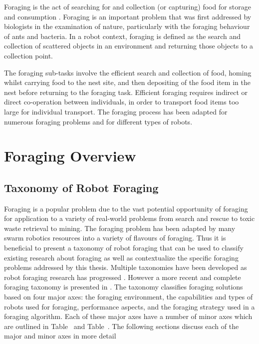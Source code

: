 Foraging is the act of searching for and collection (or capturing) food for storage and consumption \cite{winfield2009foraging}. Foraging is an important problem that was first addressed by biologists in the examination of nature, particularly with the foraging behaviour of ants and bacteria. In a robot context, foraging is defined as the search and collection of scattered objects in an environment and returning those objects to a collection point.

The foraging sub-tasks involve the efficient search and collection of food, homing whilst carrying food to the nest site, and then depositing of the food item in the nest before returning to the foraging task. Efficient foraging requires indirect or direct co-operation between individuals, in order to transport food items too large for individual transport. The foraging process has been adapted for numerous foraging problems and for different types of robots.

\section{Foraging Overview}

\subsection{Taxonomy of Robot Foraging}
\label{sec:second:types}

Foraging is a popular problem due to the vast potential opportunity of foraging for application to a variety of real-world problems from search and rescue \cite{jennings1997cooperative} to toxic waste retrieval to mining. The foraging problem has been adapted by many swarm robotics resources into a variety of flavours of foraging. Thus it is beneficial to present a taxonomy of robot foraging that can be used to classify existing research about foraging as well as contextualize the specific foraging problems addressed by this thesis. Multiple taxonomies have been developed as robot foraging research has progressed \cite{oster1978caste,ostergaard2001emergent}. However a more recent and complete foraging taxonomy is presented in \cite{winfield2009foraging}. The taxonomy classifies foraging solutions based on four major axes: the foraging environment, the capabilities and types of robots used for foraging, performance aspects, and the foraging strategy used in a foraging algorithm. Each of these major axes have a number of minor axes which are outlined in Table~\cite{foragingtaxonomytable_part1} and Table~\cite{foragingtaxonomytable_part2}.  The following sections discuss each of the major and minor axes in more detail

